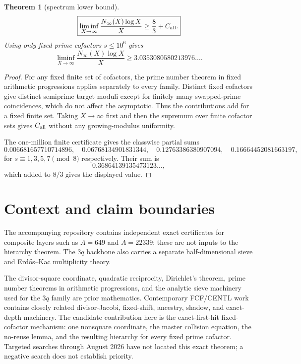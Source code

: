 \documentclass[11pt]{article}
\newtheorem{theorem}{Theorem}
\theoremstyle{definition}
\begin{document}
\begin{theorem}[spectrum lower bound]\label{thm:count}
\[
\boxed{
\liminf_{X\to\infty}
\frac{N_\infty(X)\log X}{X}
\ge\frac83+C_{\rm all}.
}
\]
Using only fixed prime cofactors $s\le10^6$ gives
\[
\boxed{
\liminf_{X\to\infty}
\frac{N_\infty(X)\log X}{X}
\ge3.0353080580213976\ldots .
}
\]
\end{theorem}

\begin{proof}
For any fixed finite set of cofactors, the prime number theorem in fixed arithmetic progressions applies separately to every family. Distinct fixed cofactors give distinct semiprime target moduli except for finitely many swapped-prime coincidences, which do not affect the asymptotic. Thus the contributions add for a fixed finite set. Taking $X\to\infty$ first and then the supremum over finite cofactor sets gives $C_{\rm all}$ without any growing-modulus uniformity.

The one-million finite certificate gives the classwise partial sums
\[
0.006681657710714896,
\quad0.06768134901831344,
\quad0.12763386380907094,
\quad0.16664452081663197,
\]
for $s\equiv1,3,5,7\pmod8$ respectively. Their sum is
\[
0.36864139135473123\ldots,
\]
which added to $8/3$ gives the displayed value.
\end{proof}

\section{Context and claim boundaries}
The accompanying repository contains independent exact certificates for composite layers such as $A=649$ and $A=22339$; these are not inputs to the hierarchy theorem. The $3q$ backbone also carries a separate half-dimensional sieve and Erd\H{o}s--Kac multiplicity theory.

The divisor-square coordinate, quadratic reciprocity, Dirichlet's theorem, prime number theorems in arithmetic progressions, and the analytic sieve machinery used for the $3q$ family are prior mathematics. Contemporary FCF/CENTL work contains closely related divisor-Jacobi, fixed-shift, ancestry, shadow, and exact-depth machinery. The candidate contribution here is the exact-first-hit fixed-cofactor mechanism: one nonsquare coordinate, the master collision equation, the no-reuse lemma, and the resulting hierarchy for every fixed prime cofactor. Targeted searches through August 2026 have not located this exact theorem; a negative search does not establish priority.
\end{document}
